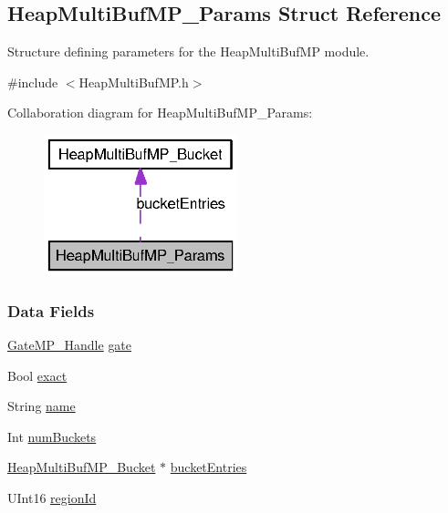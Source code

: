 \subsection{HeapMultiBufMP\_\-Params Struct Reference}
\label{struct_heap_multi_buf_m_p___params}


Structure defining parameters for the HeapMultiBufMP module.  




{\ttfamily \#include $<$HeapMultiBufMP.h$>$}



Collaboration diagram for HeapMultiBufMP\_\-Params:
\nopagebreak
\begin{figure}[H]
\begin{center}
\leavevmode
\includegraphics[width=159pt]{struct_heap_multi_buf_m_p___params__coll__graph}
\end{center}
\end{figure}
\subsubsection*{Data Fields}
\begin{DoxyCompactItemize}
\item 
\hyperlink{_gate_m_p_8h_ad5bb259f928a14e98d973334bc60ebb3}{GateMP\_\-Handle} \hyperlink{struct_heap_multi_buf_m_p___params_a3c5f4bb4ecfb525299208a686c27cbfd}{gate}
\item 
Bool \hyperlink{struct_heap_multi_buf_m_p___params_a3ed83d3de19f3fd04062229fe6c693f7}{exact}
\item 
String \hyperlink{struct_heap_multi_buf_m_p___params_ac7a5994ab0dd02e88d3ad16e23b1a548}{name}
\item 
Int \hyperlink{struct_heap_multi_buf_m_p___params_a30eef328df3b8f69f50a013defb5fbb1}{numBuckets}
\item 
\hyperlink{struct_heap_multi_buf_m_p___bucket}{HeapMultiBufMP\_\-Bucket} $\ast$ \hyperlink{struct_heap_multi_buf_m_p___params_ac130e0ad7fad30d9c759af90984dee8b}{bucketEntries}
\item 
UInt16 \hyperlink{struct_heap_multi_buf_m_p___params_aa3c641a64db9b4ff0c93f9a0c265f8d7}{regionId}
\end{DoxyCompactItemize}


